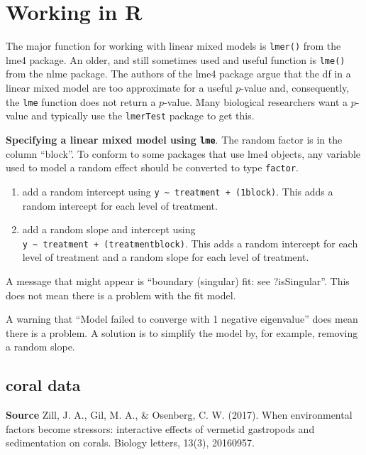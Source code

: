 \documentclass[]{book}
\providecommand{\tightlist}{%
  \setlength{\itemsep}{0pt}\setlength{\parskip}{0pt}}
\begin{document}
\hypertarget{working-in-r-6}{%
\section{Working in R}\label{working-in-r-6}}

The major function for working with linear mixed models is \texttt{lmer()} from the lme4 package. An older, and still sometimes used and useful function is \texttt{lme()} from the nlme package. The authors of the lme4 package argue that the df in a linear mixed model are too approximate for a useful \(p\)-value and, consequently, the \texttt{lme} function does not return a \(p\)-value. Many biological researchers want a \(p\)-value and typically use the \texttt{lmerTest} package to get this.

\textbf{Specifying a linear mixed model using \texttt{lme}}. The random factor is in the column ``block''. To conform to some packages that use lme4 objects, any variable used to model a random effect should be converted to type \texttt{factor}.

\begin{enumerate}
\def\labelenumi{\arabic{enumi}.}
\tightlist
\item
  add a random intercept using \texttt{y\ \textasciitilde{}\ treatment\ +\ (1\textbar{}block)}. This adds a random intercept for each level of treatment.
\item
  add a random slope and intercept using \texttt{y\ \textasciitilde{}\ treatment\ +\ (treatment\textbar{}block)}. This adds a random intercept for each level of treatment and a random slope for each level of treatment.
\end{enumerate}

A message that might appear is ``boundary (singular) fit: see ?isSingular''. This does not mean there is a problem with the fit model.

A warning that ``Model failed to converge with 1 negative eigenvalue'' does mean there is a problem. A solution is to simplify the model by, for example, removing a random slope.

\hypertarget{coral-data}{%
\subsection{coral data}\label{coral-data}}

\textbf{Source} Zill, J. A., Gil, M. A., \& Osenberg, C. W. (2017). When environmental factors become stressors: interactive effects of vermetid gastropods and sedimentation on corals. Biology letters, 13(3), 20160957.
\end{document}
